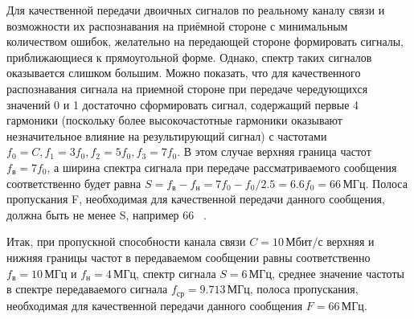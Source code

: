 Для качественной передачи двоичных сигналов по реальному каналу связи и возможности их распознавания на приёмной стороне с минимальным количеством ошибок, желательно на передающей стороне формировать сигналы, приближающиеся к прямоугольной форме. Однако, спектр таких сигналов оказывается слишком большим. Можно показать, что для качественного распознавания сигнала на приемной стороне при передаче чередующихся значений 0 и 1 достаточно сформировать сигнал, содержащий первые 4 гармоники (поскольку более высокочастотные гармоники оказывают незначительное влияние на результирующий сигнал) с частотами $f_0=C, f_1=3f_0, f_2=5f_0, f_3=7f_0$. В этом случае верхняя граница частот $f_{\text{в}}=7f_0$, а ширина спектра сигнала при передаче рассматриваемого сообщения соответственно будет равна $S = f_{\text{в}} - f_{\text{н}} = 7f_0-f_0/2.5=6.6f_0=66 \, \text{МГц}$. Полоса пропускания F, необходимая для качественной передачи данного сообщения, должна быть не менее S, например 66 \, .

Итак, при пропускной способности канала связи $C = 10 \, \text{Мбит/с}$ верхняя и нижняя границы частот в передаваемом сообщении равны соответственно $f_{\text{в}} = 10 \, \text{МГц}$ и $f_{\text{н}} = 4 \, \text{МГц}$, спектр сигнала $S = 6 \, \text{МГц}$, среднее значение частоты в спектре передаваемого сигнала $f_{\text{ср}} = 9.713 \, \text{МГц}$, полоса пропускания, необходимая для качественной передачи данного сообщения $F=66 \, \text{МГц}$.
